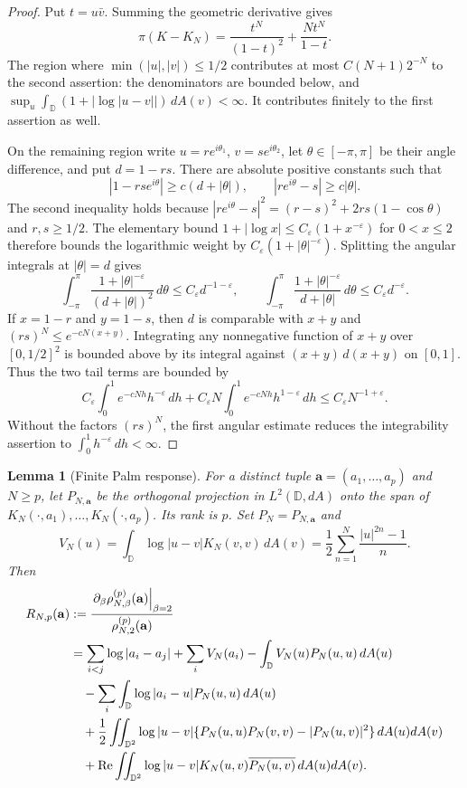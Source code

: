 \documentclass[11pt,a4paper]{article}
\numberwithin{equation}{section}
\newtheorem{lemma}[theorem]{Lemma}
\theoremstyle{definition}
\theoremstyle{remark}
\newcommand{\D}{\mathbb D}
\begin{document}
\begin{proof}
Put $t=u\bar v$.  Summing the geometric derivative gives
\[
 \pi(K-K_N)=\frac{t^N}{(1-t)^2}+
                  \frac{N t^N}{1-t}.
\]
The region where $\min(|u|,|v|)\le1/2$ contributes at most
$C(N+1)2^{-N}$ to the second assertion: the denominators are bounded
below, and $\sup_u\int_\D(1+|\log|u-v||)\,dA(v)<\infty$.
It contributes finitely to the first assertion as well.

On the remaining region write $u=re^{i\theta_1}$,
$v=se^{i\theta_2}$, let $\theta\in[-\pi,\pi]$ be their angle
difference, and put $d=1-rs$.  There are absolute positive constants
such that
\[
 |1-rse^{i\theta}|\ge c(d+|\theta|),\qquad
 |re^{i\theta}-s|\ge c|\theta|.
\]
The second inequality holds because
$|re^{i\theta}-s|^2=(r-s)^2+2rs(1-\cos\theta)$ and $r,s\ge1/2$.
The elementary bound $1+|\log x|\le C_\varepsilon(1+x^{-\varepsilon})$
for $0<x\le2$ therefore bounds the logarithmic weight by
$C_\varepsilon(1+|\theta|^{-\varepsilon})$.  Splitting the angular
integrals at $|\theta|=d$ gives
\[
 \int_{-\pi}^{\pi}
 \frac{1+|\theta|^{-\varepsilon}}{(d+|\theta|)^2}\,d\theta
 \le C_\varepsilon d^{-1-\varepsilon},\qquad
 \int_{-\pi}^{\pi}
 \frac{1+|\theta|^{-\varepsilon}}{d+|\theta|}\,d\theta
 \le C_\varepsilon d^{-\varepsilon}.
\]
If $x=1-r$ and $y=1-s$, then $d$ is comparable with $x+y$ and
$(rs)^N\le e^{-cN(x+y)}$.  Integrating any nonnegative function of
$x+y$ over $[0,1/2]^2$ is bounded above by its integral against
$(x+y)\,d(x+y)$ on $[0,1]$.  Thus the two tail terms are bounded by
\[
 C_\varepsilon\int_0^1 e^{-cNh}h^{-\varepsilon}\,dh
 +C_\varepsilon N\int_0^1e^{-cNh}h^{1-\varepsilon}\,dh
 \le C_\varepsilon N^{-1+\varepsilon}.
\]
Without the factors $(rs)^N$, the first angular estimate reduces
the integrability assertion to $\int_0^1h^{-\varepsilon}\,dh<\infty$.
\end{proof}

\begin{lemma}[Finite Palm response]
\label{lem:beta2-finite-palm-response}
For a distinct tuple $\mathbf a=(a_1,\ldots,a_p)$ and $N\ge p$, let
$P_{N,\mathbf a}$ be the orthogonal projection in $L^2(\D,dA)$ onto
the span of $K_N(\cdot,a_1),\ldots,K_N(\cdot,a_p)$.  Its rank is $p$.
Set $P_N=P_{N,\mathbf a}$ and
\[
 V_N(u)=\int_\D\log|u-v|K_N(v,v)\,dA(v)
       =\frac12\sum_{n=1}^N\frac{|u|^{2n}-1}{n}.
\]
Then
\begin{align}
 R_{N,p}(\mathbf a)
 &:=\frac{\left.\partial_\beta\rho_{N,\beta}^{(p)}(\mathbf a)
                       \right|_{\beta=2}}
                         {\rho_{N,2}^{(p)}(\mathbf a)}\notag\\
 &=\sum_{i<j}\log|a_i-a_j|+
      \sum_i V_N(a_i)-\int_\D V_N(u)P_N(u,u)\,dA(u)\notag\\
 &\quad-\sum_i\int_\D\log|a_i-u|P_N(u,u)\,dA(u)\notag\\
 &\quad+\frac12\iint_{\D^2}\log|u-v|
       \{P_N(u,u)P_N(v,v)-|P_N(u,v)|^2\}\,dA(u)dA(v)\notag\\
 &\quad+\operatorname{Re}\iint_{\D^2}\log|u-v|
                  K_N(u,v)\overline{P_N(u,v)}\,dA(u)dA(v).
 \label{eq:beta2-finite-palm-response}
\end{align}
\end{lemma}
\end{document}
